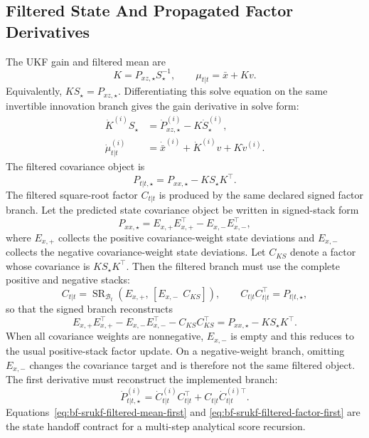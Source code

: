 \subsection{Filtered State And Propagated Factor Derivatives}
\label{sec:bf-srukf-filtered-state}

The UKF gain and filtered mean are
\[
  K=P_{xz,\star}S_\star^{-1},\qquad
  \mu_{t|t}=\bar x+Kv .
\]
Equivalently, \(KS_\star=P_{xz,\star}\).  Differentiating this solve equation
on the same invertible innovation branch gives the gain derivative in solve
form:
\begin{align}
\label{eq:bf-srukf-gain-first}
  \dot K^{(i)}S_\star
  &=
  \dot P_{xz,\star}^{(i)}-K\dot S_\star^{(i)},\\
\label{eq:bf-srukf-filtered-mean-first}
  \dot\mu_{t|t}^{(i)}
  &=
  \dot{\bar x}^{(i)}+\dot K^{(i)}v+K\dot v^{(i)} .
\end{align}
The filtered covariance object is
\[
  P_{t|t,\star}
  =
  P_{xx,\star}-K S_\star K^\top .
\]
The filtered square-root factor \(C_{t|t}\) is produced by the same declared
signed factor branch.  Let the predicted state covariance object be written in
signed-stack form
\[
  P_{xx,\star}=E_{x,+}E_{x,+}^\top-E_{x,-}E_{x,-}^\top,
\]
where \(E_{x,+}\) collects the positive covariance-weight state deviations and
\(E_{x,-}\) collects the negative covariance-weight state deviations.  Let
\(C_{KS}\) denote a factor whose covariance is \(K S_\star K^\top\).  Then the
filtered branch must use the complete positive and negative stacks:
\begin{equation}
\label{eq:bf-srukf-filtered-factor}
  C_{t|t}
  =
  \operatorname{SR}_{\mathcal B_t}
  \left(E_{x,+},\,[E_{x,-}\ \ C_{KS}]\right),
  \qquad
  C_{t|t}C_{t|t}^\top=P_{t|t,\star},
\end{equation}
so that the signed branch reconstructs
\[
  E_{x,+}E_{x,+}^\top-E_{x,-}E_{x,-}^\top-C_{KS}C_{KS}^\top
  =
  P_{xx,\star}-KS_\star K^\top.
\]
When all covariance weights are nonnegative, \(E_{x,-}\) is empty and this
reduces to the usual positive-stack factor update.  On a negative-weight branch,
omitting \(E_{x,-}\) changes the covariance target and is therefore not the same
filtered object.  The first derivative must reconstruct the implemented branch:
\begin{equation}
\label{eq:bf-srukf-filtered-factor-first}
  \dot P_{t|t,\star}^{(i)}
  =
  \dot C_{t|t}^{(i)}C_{t|t}^\top
  +C_{t|t}\dot C_{t|t}^{(i)\top}.
\end{equation}
Equations~\eqref{eq:bf-srukf-filtered-mean-first} and
\eqref{eq:bf-srukf-filtered-factor-first} are the state handoff contract for a
multi-step analytical score recursion.

